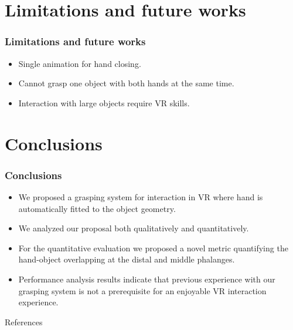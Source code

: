 \documentclass{beamer}
\theoremstyle{remark}
\theoremstyle{plain}
\begin{document}
\section{Limitations and future works}

\begin{frame}
	\frametitle{Limitations and future works}
	
	\begin{itemize}
		\item Single animation for hand closing.
		\item Cannot grasp one object with both hands at the same time.
		\item Interaction with large objects require VR skills.
	\end{itemize}
\end{frame}

\section{Conclusions}

\begin{frame}
	\frametitle{Conclusions}
	
	\begin{itemize}
		\item We proposed a grasping system for interaction in VR where hand is automatically fitted to the object geometry.
		\item We analyzed our proposal both qualitatively and quantitatively.
		\item For the quantitative evaluation we proposed a novel metric quantifying the hand-object overlapping at the distal and middle phalanges.
		\item Performance analysis results indicate that previous experience with our grasping system is not a prerequisite for an enjoyable VR interaction experience.
	\end{itemize}
	
\end{frame}


\begin{frame}
	\titlepage
\end{frame}


\setcounter{lastframe}{\insertframenumber}

\begin{frame}[allowframebreaks]{References}


\end{frame}
\end{document}

